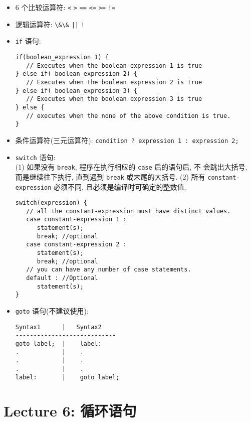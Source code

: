 \documentclass[a4paper,UTF8]{ctexart}
\begin{document}
\begin{itemize}[leftmargin=0pt, rightmargin=0cm, labelwidth=0.8cm, labelsep=0.2cm]
\item 6 个比较运算符: \lstinline{<} \quad \lstinline{>} \quad \lstinline{==}
  \quad \lstinline{<=} \quad \lstinline{>=} \quad \lstinline{!=}
\item 逻辑运算符: \lstinline{\&\&} \quad \lstinline{||} \quad \lstinline{!}
\item \lstinline{if} 语句:
\begin{lstlisting}
if(boolean_expression 1) {
   // Executes when the boolean expression 1 is true
} else if( boolean_expression 2) {
   // Executes when the boolean expression 2 is true
} else if( boolean_expression 3) {
   // Executes when the boolean expression 3 is true
} else {
   // executes when the none of the above condition is true.
}
\end{lstlisting}
\item 条件运算符(三元运算符): \lstinline{condition ? expression 1 : expression 2;}
\item \lstinline{switch} 语句:\\
(1) 如果没有 \lstinline{break}, 程序在执行相应的 \lstinline{case} 后的语句后, 不
会跳出大括号, 而是继续往下执行, 直到遇到 \lstinline{break} 或末尾的大括号.
(2) 所有 \lstinline{constant-expression} 必须不同, 且必须是编译时可确定的整数值.
\begin{lstlisting}
switch(expression) {
   // all the constant-expression must have distinct values.
   case constant-expression 1 :
      statement(s);
      break; //optional
   case constant-expression 2 :
      statement(s);
      break; //optional
   // you can have any number of case statements.
   default : //Optional
      statement(s);
}
\end{lstlisting}
\item \lstinline{goto} 语句(不建议使用):
\begin{lstlisting}
Syntax1      |   Syntax2
----------------------------
goto label;  |    label:  
.            |    .
.            |    .
.            |    .
label:       |    goto label;
\end{lstlisting}
\end{itemize}

\section{Lecture 6: 循环语句}
\end{document}
